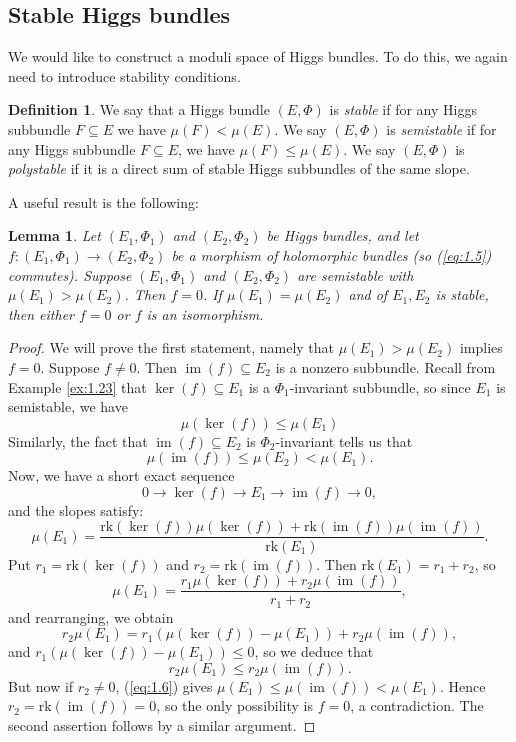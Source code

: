 \documentclass[10pt]{amsart}
\numberwithin{equation}{section}
\newcommand{\im}{\mathop{\mathrm{im}}}
\newcommand{\rk}{\mathrm{rk}}
\theoremstyle{plain}
\newtheorem{lem}[thm]{Lemma}
\theoremstyle{definition}
\newtheorem{defn}[thm]{Definition}
\theoremstyle{remark}
\begin{document}
\subsection{Stable Higgs bundles} We would like to construct a moduli space of Higgs bundles. To do this, we again need to introduce stability conditions.  
\begin{defn}
    We say that a Higgs bundle $(E, \Phi)$ is \emph{stable} if for any Higgs subbundle $F \subseteq E$ we have $\mu(F) < \mu(E)$. We say $(E, \Phi)$ is \emph{semistable} if for any Higgs subbundle $F \subseteq E$, we have $\mu(F) \le \mu(E)$. We say $(E, \Phi)$ is \emph{polystable} if it is a direct sum of stable Higgs subbundles of the same slope.
\end{defn}


A useful result is the following:
\begin{lem}
    Let $(E_1, \Phi_1)$ and $(E_2, \Phi_2)$ be Higgs bundles, and let $f: (E_1, \Phi_1) \to (E_2, \Phi_2)$ be a morphism of holomorphic bundles (so (\ref{eq:1.5}) commutes). Suppose $(E_1, \Phi_1)$ and $(E_2, \Phi_2)$ are semistable with $\mu(E_1) > \mu(E_2)$. Then $f = 0$. If $\mu(E_1) = \mu(E_2)$ and of $E_1, E_2$ is stable, then either $f = 0$ or $f$ is an isomorphism.
\end{lem}

\begin{proof}
    We will prove the first statement, namely that $\mu(E_1) > \mu(E_2)$ implies $f = 0$. Suppose $f \ne 0$. Then $\im(f) \subseteq E_2$ is a nonzero subbundle. Recall from Example \ref{ex:1.23} that $\ker(f) \subseteq E_1$ is a $\Phi_1$-invariant subbundle, so since $E_1$ is semistable, we have
    \[\mu(\ker(f)) \le \mu(E_1)\] 
    Similarly, the fact that $\im(f) \subseteq E_2$ is $\Phi_2$-invariant tells us that
    \begin{equation}\label{eq:1.6}
    \mu(\im(f)) \le \mu(E_2) < \mu(E_1).
    \end{equation}
    Now, we have a short exact sequence
    \[0 \to \ker(f) \to E_1 \to \im(f) \to 0,\]
    and the slopes satisfy:
    \[\mu(E_1) = \frac{\rk(\ker(f))\mu(\ker(f)) + \rk(\im(f))\mu(\im(f))}{\rk(E_1)}.\]
    Put $r_1 = \rk(\ker(f))$ and $r_2 = \rk(\im(f))$. Then $\rk(E_1) = r_1 + r_2$, so
    \[\mu(E_1) = \frac{r_1 \mu(\ker(f)) + r_2 \mu(\im(f))}{r_1 + r_2},\]
    and rearranging, we obtain
    \[r_2 \mu(E_1) = r_1\left( \mu(\ker(f)) - \mu(E_1) \right) + r_2 \mu(\im(f)),\]
    and $ r_1\left( \mu(\ker(f)) - \mu(E_1) \right)  \le 0$, so we deduce that 
    \[r_2\mu(E_1) \le r_2 \mu(\im(f)).\]
    But now if $r_2 \ne 0$, (\ref{eq:1.6}) gives $\mu(E_1) \le \mu(\im(f)) < \mu(E_1)$. Hence $r_2 = \rk(\im(f)) = 0$, so the only possibility is $f = 0$, a contradiction. The second assertion follows by a similar argument. 
\end{proof}
\end{document}
